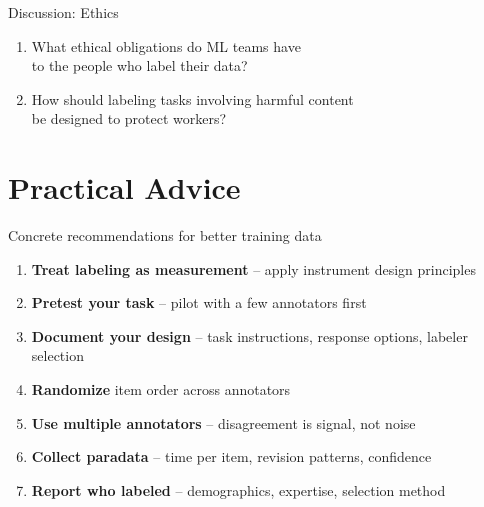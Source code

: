 \documentclass[aspectratio=169,11pt]{beamer}
\begin{document}
\begin{frame}{Discussion: Ethics}

\begin{enumerate}
  \item What ethical obligations do ML teams have\\
        to the people who label their data?

  \vspace{1em}

  \item How should labeling tasks involving harmful content\\
        be designed to protect workers?
\end{enumerate}
\end{frame}


\section{Practical Advice}

\begin{frame}{Concrete recommendations for better training data}

\begin{enumerate}
  \item \textbf{Treat labeling as measurement} -- apply instrument design principles
  \item \textbf{Pretest your task} -- pilot with a few annotators first
  \item \textbf{Document your design} -- task instructions, response options, labeler selection
  \item \textbf{Randomize} item order across annotators
  \item \textbf{Use multiple annotators} -- disagreement is signal, not noise
  \item \textbf{Collect paradata} -- time per item, revision patterns, confidence
  \item \textbf{Report who labeled} -- demographics, expertise, selection method
\end{enumerate}
\end{frame}
\end{document}
